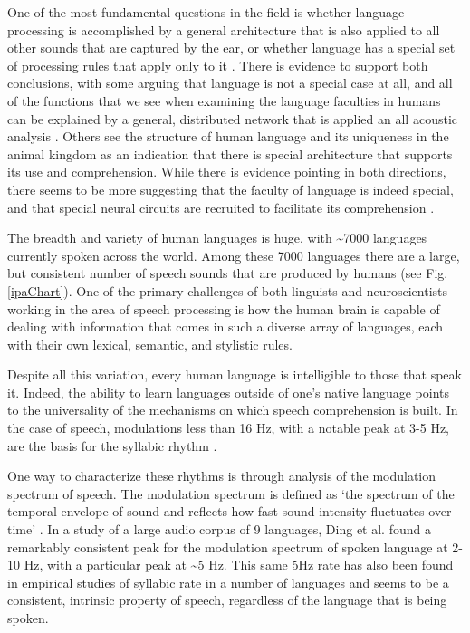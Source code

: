 \documentclass[titlepage]{article}
\begin{document}
    One of the most fundamental questions in the field is whether language processing
    is accomplished by a general architecture that is also applied to all other sounds
    that are captured by the ear, or whether language has a special set of processing
    rules that apply only to it \cite{Uddin2018}. There is evidence to support both
    conclusions, with some arguing that language is not a special case at all, and all
    of the functions that we see when examining the language faculties in humans can be
    explained by a general, distributed network that is applied an all acoustic analysis
    \cite{Dick2001}. Others see the structure of human language and its uniqueness in the
    animal kingdom \cite{Chomsky1986,Fodor1983} as an indication that there is special
    architecture that supports its use and comprehension. While there is evidence 
    pointing in both directions, there seems to be more suggesting that the faculty 
    of language is indeed special, and that special neural circuits are recruited 
    to facilitate its comprehension \cite{Pinker2005}.

    The breadth and variety of human languages is huge, with
    \textasciitilde 7000 \cite{Simons2017} languages currently spoken across 
    the world. Among these 7000 languages
    there are a large, but consistent number of speech sounds that are produced 
    by humans (see Fig.\ref{ipaChart}). One of the primary challenges of both
    linguists and neuroscientists working in the area of speech processing is
    how the human brain is capable of dealing with information that comes in 
    such a diverse array of languages, each with their own lexical, semantic, 
    and stylistic rules.

    Despite all this variation, every human language is intelligible to those 
    that speak it. Indeed, the ability to learn languages outside of one's 
    native language points to the universality of the mechanisms on which 
    speech comprehension is built. In the case of speech, modulations less than 
    16 Hz, with a notable peak at 3-5 Hz, are the basis for the syllabic rhythm 
    \cite{Giraud2012,Greenberg2003}.

    One way to characterize these rhythms is through analysis of the 
    modulation spectrum of speech. The modulation spectrum is defined as 
    `the spectrum of the temporal envelope of sound and
    reflects how fast sound intensity fluctuates over time' \cite{Ding2017}. 
    In a study of
    a large audio corpus of 9 languages, Ding et al. \cite{Ding2017} found a 
    remarkably
    consistent peak for the modulation spectrum of spoken language at 2-10 Hz, 
    with a particular
    peak at \textasciitilde 5 Hz. This same 5Hz rate has also been found in 
    empirical studies of syllabic
    rate in a number of languages \cite{Pellegrino2011} and seems to be a 
    consistent, intrinsic
    property of speech, regardless of the language that is being spoken.
\end{document}
